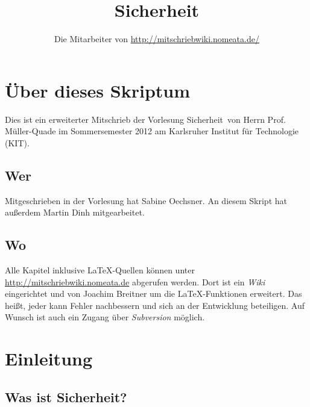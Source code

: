 \documentclass[a4paper,twoside,DIV15,BCOR12mm]{scrbook}
\author{Die Mitarbeiter von \url{http://mitschriebwiki.nomeata.de/}}
\title{Sicherheit}
\begin{document}
\maketitle

\renewcommand{\thechapter}{\Roman{chapter}}
\tableofcontents


\chapter{Über dieses Skriptum}
Dies ist ein erweiterter Mitschrieb der Vorlesung \glqq Sicherheit\grqq\ von Herrn Prof. Müller-Quade im
Sommersemester 2012 am Karlsruher Institut für Technologie (KIT).

\section{Wer}
Mitgeschrieben in der Vorlesung hat Sabine Oechsner. An diesem Skript hat außerdem Martin Dinh mitgearbeitet.

\section{Wo}
Alle Kapitel inklusive \LaTeX-Quellen können unter \url{http://mitschriebwiki.nomeata.de} abgerufen werden.
Dort ist ein \emph{Wiki} eingerichtet und von Joachim Breitner um die \LaTeX-Funktionen erweitert.
Das heißt, jeder kann Fehler nachbessern und sich an der Entwicklung
beteiligen. Auf Wunsch ist auch ein Zugang über \emph{Subversion} möglich.




\chapter{Einleitung}

\section{Was ist Sicherheit?}
\end{document}
